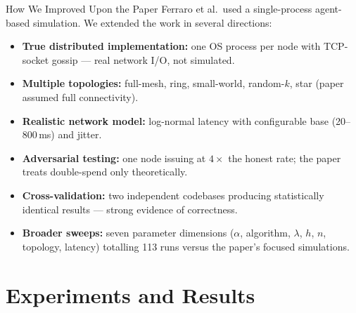 \documentclass[aspectratio=169]{beamer}
\begin{document}
\begin{frame}{How We Improved Upon the Paper}
  Ferraro et al.\ used a single-process agent-based simulation.  We extended the work in several directions:
  \begin{itemize}
    \item \textbf{True distributed implementation:} one OS process per node with TCP-socket gossip --- real network I/O, not simulated.
    \item \textbf{Multiple topologies:} full-mesh, ring, small-world, random-$k$, star (paper assumed full connectivity).
    \item \textbf{Realistic network model:} log-normal latency with configurable base (20--800\,ms) and jitter.
    \item \textbf{Adversarial testing:} one node issuing at $4\times$ the honest rate; the paper treats double-spend only theoretically.
    \item \textbf{Cross-validation:} two independent codebases producing statistically identical results --- strong evidence of correctness.
    \item \textbf{Broader sweeps:} seven parameter dimensions ($\alpha$, algorithm, $\lambda$, $h$, $n$, topology, latency) totalling 113 runs versus the paper's focused simulations.
  \end{itemize}
\end{frame}

\section{Experiments and Results}
\end{document}
